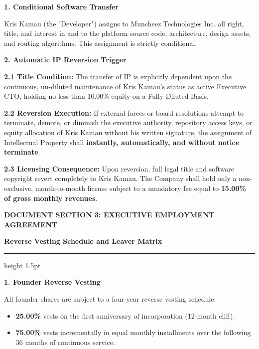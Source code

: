\documentclass[11pt,a4paper]{article}
\begin{document}
\textbf{\color{CorporateNavy} 1. Conditional Software Transfer}

Kris Kamau (the "Developer") assigns to Muncheez Technologies Inc. all right, title, and interest in and to the platform source code, architecture, design assets, and routing algorithms. This assignment is strictly conditional.

\vspace{0.2cm}
\textbf{\color{CorporateNavy} 2. Automatic IP Reversion Trigger}

\textbf{2.1 Title Condition:} The transfer of IP is explicitly dependent upon the continuous, un-diluted maintenance of Kris Kamau's status as active Executive CTO, holding no less than 10.00\% equity on a Fully Diluted Basis.

\textbf{2.2 Reversion Execution:} If external forces or board resolutions attempt to terminate, demote, or diminish the executive authority, repository access keys, or equity allocation of Kris Kamau without his written signature, the assignment of Intellectual Property shall \textbf{instantly, automatically, and without notice terminate}.

\textbf{2.3 Licensing Consequence:} Upon reversion, full legal title and software copyright revert completely to Kris Kamau. The Company shall hold only a non-exclusive, month-to-month license subject to a mandatory fee equal to \textbf{15.00\% of gross monthly revenues}.

\vspace{1.2cm}

{\fontsize{18}{22}\sffamily\bfseries\color{CorporateNavy} DOCUMENT SECTION 3: EXECUTIVE EMPLOYMENT AGREEMENT}

\vspace{0.1cm}
\textsf{\small\bfseries\color{LinkBlue} Reverse Vesting Schedule and Leaver Matrix}
\vspace{0.2cm}
\color{RuleNavy}\hrule height 1.5pt
\vspace{0.4cm}

\textbf{\color{CorporateNavy} 1. Founder Reverse Vesting}

All founder shares are subject to a four-year reverse vesting schedule:
\begin{itemize}
    \item \textbf{25.00\%} vests on the first anniversary of incorporation (12-month cliff).
    \item \textbf{75.00\%} vests incrementally in equal monthly installments over the following 36 months of continuous service.
\end{itemize}
\end{document}
